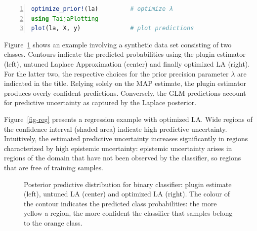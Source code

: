 \documentclass{juliacon}
\begin{document}
\begin{lstlisting}[language=Julia, escapechar=@, numbers=left, label={lst:laplace}, caption={}]
optimize_prior!(la)         # optimize λ
using TaijaPlotting
plot(la, X, y)              # plot predictions
\end{lstlisting}

Figure~\ref{fig-class} shows an example involving a synthetic data set
consisting of two classes. Contours indicate the predicted probabilities
using the plugin estimator (left), untuned Laplace Approximation
(center) and finally optimized LA (right). For the latter two, the
respective choices for the prior precision parameter \(\lambda\) are
indicated in the title. Relying solely on the MAP estimate, the plugin
estimator produces overly confident predictions. Conversely, the GLM
predictions account for predictive uncertainty as captured by the
Laplace posterior.

Figure~\ref{fig-reg} presents a regression example with optimized LA.
Wide regions of the confidence interval (shaded area) indicate high
predictive uncertainty. Intuitively, the estimated predictive
uncertainty increases significantly in regions characterized by high
epistemic uncertainty: epistemic uncertainty arises in regions of the
domain that have not been observed by the classifier, so regions that
are free of training samples.

\begin{figure}


\caption{\label{fig-class}Posterior predictive distribution for binary
classifier: plugin estimate (left), untuned LA (center) and optimized LA
(right). The colour of the contour indicates the predicted class
probabilities: the more yellow a region, the more confident the
classifier that samples belong to the orange class.}

\end{figure}%
\end{document}

